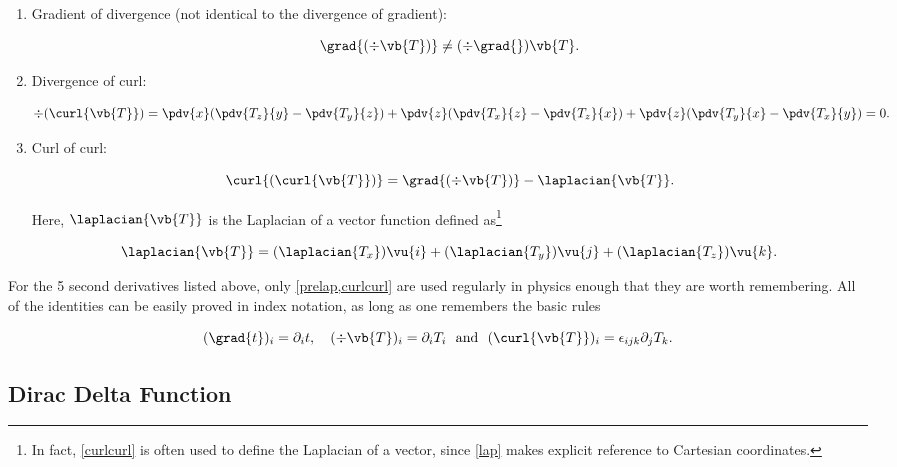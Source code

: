\documentclass[english,a4paper,12pt]{report}
\begin{document}
\begin{enumerate}
	\item Gradient of divergence (not identical to the divergence of gradient):
		
	\begin{equation} 
		\grad{(\div{\vb{T}})} \neq (\div{\grad{} } )\vb{T}. 
	\end{equation}
		
	\item Divergence of curl:
		
	\begin{equation} 
		\div{(\curl{\vb{T}})} = \pdv{x}(\pdv{T_z}{y} - \pdv{T_y}{z}) + \pdv{z}(\pdv{T_x}{z} - \pdv{T_z}{x}) + \pdv{z}(\pdv{T_y}{x} - \pdv{T_x}{y}) = 0. \label{divcurl} 
	\end{equation}
		
	\item Curl of curl:
		
	\begin{equation} 
		\curl{(\curl{\vb{T}})} = \grad{(\div{\vb{T}})} - \laplacian{\vb{T}}. \label{curlcurl} 
	\end{equation} 
		
	Here, \(\laplacian{\vb{T}}\) is the Laplacian of a vector function defined as\footnote{In fact, \cref{curlcurl} is often used to define the Laplacian of a vector, since \cref{lap} makes explicit reference to Cartesian coordinates.}
		
	\begin{equation} 
		\laplacian{\vb{T}} = (\laplacian{T_x})\vu{i} + (\laplacian{T_y})\vu{j} + (\laplacian{T_z})\vu{k}. 
	\end{equation}	
\end{enumerate}	
	
For the 5 second derivatives listed above, only \cref{prelap,curlcurl} are used regularly in physics enough that they are worth remembering. All of the identities can be easily proved in index notation, as long as one remembers the basic rules 

\begin{equation}
	(\grad{t} )_{i} = \partial _{i}t, \quad (\div{\vb{T} } )_{i} = \partial _{i}T_{i} ~\text { and }~ (\curl{\vb{T} } )_{i} = \epsilon _{ijk}\partial _{j}T_{k}.          
\end{equation}


	
\subsection{Dirac Delta Function}
	
\end{document}
